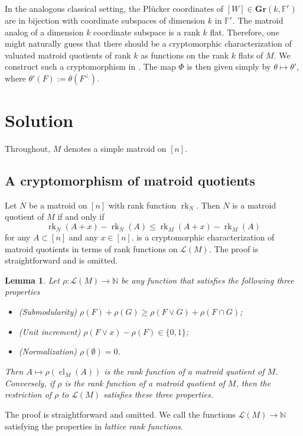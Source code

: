 \documentclass{article}
\newtheorem{lemma}[theorem]{Lemma}
\theoremstyle{definition}
\newcommand{\rk}{\operatorname{rk}}
\newcommand{\cl}{\operatorname{cl}}
\newcommand{\N}{\mathbb{N}}
\newcommand{\bF}{\mathbb{F}}
\newcommand{\cLL}{\mathcal{L}}
\newcommand{\Gr}{\mathbf{Gr}}
\begin{document}
In the analogous classical setting, the Pl\"ucker coordinates of $[W]\in\Gr(k,\bF^r)$ are in bijection with coordinate subspaces of dimension $k$ in $\bF^r$. The matroid analog of a dimension $k$ coordinate subspace is a rank $k$ flat. Therefore, one might naturally guess that there should be a cryptomorphic characterization of valuated matroid quotients of rank $k$ as functions on the rank $k$ flats of $M$. We construct such a cryptomorphism in . The map $\Phi$ is then given simply by $\theta\mapsto\theta'$, where $\theta'(F):=\theta(F^\perp)$.

\section{Solution}

Throughout, $M$ denotes a simple matroid on $[n]$. 

\subsection{A cryptomorphism of matroid quotients}

Let $N$ be a matroid on $[n]$ with rank function $\rk_N$. Then $N$ is a matroid quotient of $M$ if and only if 
\begin{equation}\label{eqn:quotient-rank-function}
    \rk_N(A+x)-\rk_N(A)\leq \rk_M(A+x)-\rk_M(A)
\end{equation}
for any $A\subset[n]$ and any $x\in [n]$.  is a cryptomorphic characterization of matroid quotients in terms of rank functions on $\cLL(M)$. The proof is straightforward and is omitted. 
\begin{lemma}\label{lem:quotient-rank-function}
    Let $\rho \colon \cLL(M)\to \N$ be any function that satisfies the following three properties
    \begin{itemize}
    \itemsep0em
        \item \emph{(Submodularity)} \hspace{.2 em}  $\rho(F)+\rho(G)\geq \rho(F\vee G)+\rho(F\cap G)$;
        \item \emph{(Unit increment)} \hspace{.1 em} $\rho(F\vee x)-\rho(F)\in \{0,1\}$;
        \item \emph{(Normalization)}  \hspace{.4 em} $\rho(\emptyset)=0$.    \end{itemize}
        Then $A\mapsto\rho(\cl_M(A))$ is the rank function of a matroid quotient of $M$. Conversely, if $\rho$ is the rank function of a matroid quotient of $M$, then the restriction of $\rho$ to $\cLL(M)$ satisfies these three properties.
\end{lemma}
\noindent The proof is straightforward and omitted. We call the functions $\cLL(M)\to\N$ satisfying the properties in  \emph{lattice rank functions}. 
\end{document}
